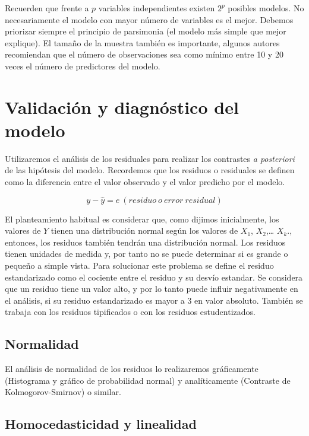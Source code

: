 \documentclass[
  spanish,
  a4paper,
]{scrbook}
\begin{document}
Recuerden que frente a \(p\) variables independientes existen \(2^p\)
posibles modelos. No necesariamente el modelo con mayor número de
variables es el mejor. Debemos priorizar siempre el principio de
parsimonia (el modelo más simple que mejor explique). El tamaño de la
muestra también es importante, algunos autores recomiendan que el número
de observaciones sea como mínimo entre 10 y 20 veces el número de
predictores del modelo.

\section{Validación y diagnóstico del
modelo}\label{validaciuxf3n-y-diagnuxf3stico-del-modelo}

Utilizaremos el análisis de los residuales para realizar los contrastes
\emph{a posteriori} de las hipótesis del modelo. Recordemos que los
residuos o residuales se definen como la diferencia entre el valor
observado y el valor predicho por el modelo.

\[
y-\hat{y}=e~(residuo~ o ~error~ residual)
\]

El planteamiento habitual es considerar que, como dijimos inicialmente,
los valores de \(Y\) tienen una distribución normal según los valores de
\(X_1\), \(X_2\),\ldots{} \(X_k\)., entonces, los residuos también
tendrán una distribución normal. Los residuos tienen unidades de medida
y, por tanto no se puede determinar si es grande o pequeño a simple
vista. Para solucionar este problema se define el residuo estandarizado
como el cociente entre el residuo y su desvío estandar. Se considera que
un residuo tiene un valor alto, y por lo tanto puede influir
negativamente en el análisis, si su residuo estandarizado es mayor a 3
en valor absoluto. También se trabaja con los residuos tipificados o con
los residuos estudentizados.

\subsection{Normalidad}\label{normalidad-3}

El análisis de normalidad de los residuos lo realizaremos gráficamente
(Histograma y gráfico de probabilidad normal) y analíticamente
(Contraste de Kolmogorov-Smirnov) o similar.

\subsection{Homocedasticidad y
linealidad}\label{homocedasticidad-y-linealidad}
\end{document}
